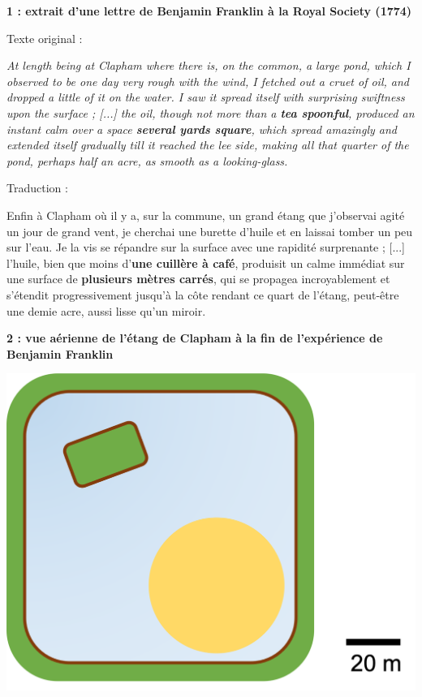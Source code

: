 \documentclass[12pt,a4paper]{article}
\begin{document}
\begin{doc}
\textbf{1 : extrait d'une lettre de Benjamin Franklin à la Royal Society (1774)}
\begin{multicols}{2}
\noindent
Texte original :

\textit{ \og
At length being at Clapham where there is, on the common, a large pond, which I observed to be one day very rough with the wind, I fetched out a cruet of oil, and dropped a little of it on the water.
I saw it spread itself with surprising swiftness upon the surface ;
[...] the oil, though not more than a \textbf{tea spoonful}, produced an instant calm over a space \textbf{several yards square}, which spread amazingly and extended itself gradually till it reached the lee side, making all that quarter of the pond, perhaps half an acre, as smooth as a looking-glass.
\fg{} }

\noindent
Traduction :

Enfin à Clapham où il y a, sur la commune, un grand étang que j'observai agité un jour de grand vent, je cherchai une burette d'huile et en laissai tomber un peu sur l'eau.
Je la vis se répandre sur la surface avec une rapidité surprenante ;
[...] l'huile, bien que moins d'\textbf{une cuillère à café}, produisit un calme immédiat sur une surface de \textbf{plusieurs mètres carrés}, qui se propagea incroyablement et s'étendit progressivement jusqu'à la côte rendant ce quart de l'étang, peut-être une demie acre, aussi lisse qu'un miroir.
\end{multicols}
\end{doc}

\begin{doc}
\textbf{2 : vue aérienne de l'étang de Clapham à la fin de l'expérience de Benjamin Franklin}

\begin{center}
\includegraphics[scale=0.5]{images/clapham_pond.png}
\end{center}
\end{doc}
\end{document}
